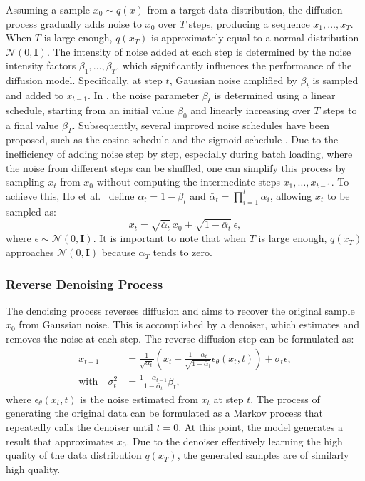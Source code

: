 \documentclass[conference]{IEEEtran}
\begin{document}
Assuming a sample $x_0 \sim q(x)$ from a target data distribution, the diffusion process gradually adds noise to $x_0$ over $T$ steps, producing a sequence $x_1, \ldots, x_T$.
When $T$ is large enough, $q(x_T)$ is approximately equal to a normal distribution $\mathcal{N}(0, \mathbf{I})$.
The intensity of noise added at each step is determined by the noise intensity factors $\beta_1, \ldots, \beta_T$, which significantly influences the performance of the diffusion model.
Specifically, at step $t$, Gaussian noise amplified by $\beta_t$ is sampled and added to $x_{t-1}$.
In \cite{jho2022}, the noise parameter $\beta_t$ is determined using a linear schedule, starting from an initial value $\beta_0$ and linearly increasing over $T$ steps to a final value $\beta_T$.
Subsequently, several improved noise schedules have been proposed, such as the cosine schedule \cite{aq} and the sigmoid schedule \cite{dp2023}.
Due to the inefficiency of adding noise step by step, especially during batch loading, where the noise from different steps can be shuffled, one can simplify this process by sampling $x_t$ from $x_0$ without computing the intermediate steps $x_1, \ldots, x_{t-1}$.
To achieve this, Ho et al.\ \cite{jho2022} define $\alpha_t = 1 - \beta_t$ and $\bar{\alpha}_t = \prod_{i=1}^{t} \alpha_i$, allowing $x_t$ to be sampled as:
\begin{equation}
  x_t = \sqrt{\bar{\alpha}_t}\, x_0 + \sqrt{1 - \bar{\alpha}_t}\, \epsilon,
  \label{eq:forward}
\end{equation}
where $\epsilon \sim \mathcal{N}(0, \mathbf{I})$.
It is important to note that when $T$ is large enough, $q(x_T)$ approaches $\mathcal{N}(0, \mathbf{I})$ because $\bar{\alpha}_T$ tends to zero.

\subsubsection{Reverse Denoising Process}

The denoising process reverses diffusion and aims to recover the original sample $x_0$ from Gaussian noise.
This is accomplished by a denoiser, which estimates and removes the noise at each step.
The reverse diffusion step can be formulated as:
\begin{align}
  x_{t-1} &= \frac{1}{\sqrt{\alpha_t}} \left( x_t - \frac{1 - \alpha_t}{\sqrt{1 - \bar{\alpha}_t}} \epsilon_\theta(x_t, t) \right) + \sigma_t \epsilon, \nonumber \\
  \text{with}\quad \sigma_t^2 &= \frac{1 - \bar{\alpha}_{t-1}}{1 - \bar{\alpha}_t} \beta_t,
  \label{eq:reverse}
\end{align}
where $\epsilon_\theta(x_t, t)$ is the noise estimated from $x_t$ at step $t$.
The process of generating the original data can be formulated as a Markov process that repeatedly calls the denoiser until $t = 0$.
At this point, the model generates a result that approximates $x_0$.
Due to the denoiser effectively learning the high quality of the data distribution $q(x_T)$, the generated samples are of similarly high quality.
\end{document}
